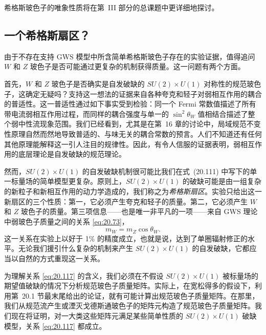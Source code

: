 希格斯玻色子的唯象性质将在第~III 部分的总课题中更详细地探讨。

\subsection{一个希格斯扇区？}

由于不存在支持 GWS 模型中所含简单希格斯玻色子存在的实验证据，值得追问 $W$ 和 $Z$ 玻色子是否可能通过更复杂的机制获得质量。这一问题有两个方面。

首先，$W$ 和 $Z$ 玻色子是否确实是自发破缺的 $SU(2)\times U(1)$ 对称性的规范玻色子，这确定无疑吗？支持这一想法的证据来自各种夸克和轻子对弱相互作用的耦合的普适性。这一普适性通过如下事实受到检验：同一个 Fermi 常数值描述了所有带电流弱相互作用过程，而同样的耦合强度与单一的 $\sin^2\theta_W$ 值相结合描述了整个弱中性流现象范围。我们已经看到，尤其是在第~16 章的讨论中，局域规范不变性原理自然而然地导致普适的、与味无关的耦合常数的预言。人们不知道还有任何其他原理能解释这一引人注目的规律性。因此，有令人信服的证据表明，弱相互作用的底层理论是自发破缺的规范理论。

然而，$SU(2)\times U(1)$ 的自发破缺机制很可能比我们在式~(20.111) 中写下的单一标量场的简单模型更复杂。原则上，$SU(2)\times U(1)$ 的破缺可能是由一组复杂的新粒子和新相互作用的动力学造成的，我们称之为\emph{希格斯扇区}。实验只给出这一新扇区的三个性质：第一，它必须产生夸克和轻子的质量。第二，它必须产生 $W$ 和 $Z$ 玻色子的质量。第三项信息——也是唯一非平凡的一项——来自 GWS 理论中弱玻色子质量之间的关系 \eqref{eq:20.73}，
\begin{equation}
  m_W = m_Z\cos\theta_W .
  \label{eq:20.117}
\end{equation}
这一关系在实验上以好于 1\% 的精度成立，也就是说，达到了单圈辐射修正的水平。无论我们援引什么复杂的机制来产生 $SU(2)\times U(1)$ 的自发破缺，它都应当以自然的方式重现这一关系。

为理解关系 \eqref{eq:20.117} 的含义，我们必须在不假设 $SU(2)\times U(1)$ 被标量场的期望值破缺的情况下分析规范玻色子质量矩阵。实际上，在宽松得多的假设下，利用第~20.1 节最末尾给出的论证，就有可能计算出规范玻色子质量矩阵。在那里，我们从规范流产生或湮灭戈德斯通玻色子的矩阵元构造了规范玻色子质量矩阵。我们现在将证明，对一大类这些矩阵元满足某些简单性质的 $SU(2)\times U(1)$ 破缺模型，关系 \eqref{eq:20.117} 都成立。

